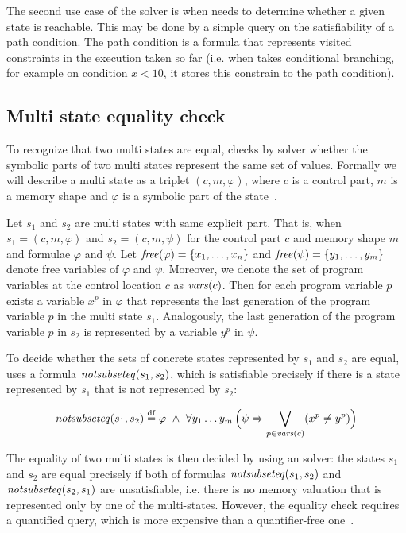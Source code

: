 The second use case of the \SMT solver is when \SymDIVINE needs to determine
whether a given state is reachable. This may be done by a simple query on the
satisfiability of a path condition. The path condition is a formula that
represents visited constraints in the execution taken so far (i.e.  when
\SymDIVINE takes conditional branching, for example on condition $x < 10$, it
stores this constrain to the path condition).

\subsection{Multi state equality check}\label{subsec:equality}

To recognize that two multi states are equal, \SymDIVINE checks by \SMT solver
whether the symbolic parts of two multi states represent the same set of values.
Formally we will describe a multi state as a triplet $(c, m, \varphi)$, where
$c$ is a control part, $m$ is a memory shape and $\varphi$ is a symbolic part of
the state~\cite{Jonas17}.

Let $s_1$ and $s_2$ are multi states with same explicit part. That is, when $s_1
= (c, m, \varphi)$ and $s_2 = (c, m, \psi)$ for the control part $c$ and memory
shape $m$ and formulae $\varphi$ and $\psi$. Let $\mathit{free}(\varphi) = \{x_1, \dots,
x_n\}$ and $\mathit{free}(\psi) = \{ y_1, \dots, y_m\}$ denote free variables of
$\varphi$ and $\psi$. Moreover, we denote the set of program variables at the
control location $c$ as $\mathit{vars}(c)$. Then for each program variable $p$ exists a
variable $x^p$ in $\varphi$ that represents the last generation of the program
variable $p$ in the multi state $s_1$. Analogously, the last generation of the
program variable $p$ in $s_2$ is represented by a variable $y^p$ in $\psi$.

To decide whether the sets of concrete states represented by $s_1$ and $s_2$ are
equal, \SymDIVINE uses a formula $\mathit{notsubseteq}(s_1, s_2)$, which is satisfiable
precisely if there is a state represented by $s_1$ that is not represented by
$s_2$:

\[
  \mathit{notsubseteq}(s_1, s_2) \stackrel{\mathrm{df}}{=} \varphi~\land~ \forall y_1 \ldots y_m
  \, \Big ( \psi \Rightarrow \bigvee_{p \in \mathit{vars}(c)} (x^p \not =
  y^p) \Big)
\]

The equality of two multi states is then decided by using an \SMT solver: the
states $s_1$ and $s_2$ are equal precisely if both of formulas
$\mathit{notsubseteq}(s_1, s_2)$ and $\mathit{notsubseteq}(s_2, s_1)$ are unsatisfiable, i.e.
there is no memory valuation that is represented only by one of the
multi-states. However, the equality check requires a quantified \SMT query,
which is more expensive than a quantifier-free one~\cite{Jonas17}.

